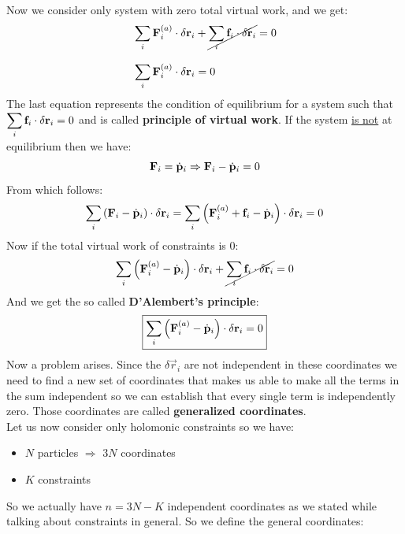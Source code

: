 Now we consider only system with zero total virtual work, and we get:
\begin{equation}
    \begin{split}
      &\displaystyle\sum_i \vb{F}^{(a)}_i \cdot \delta \vb{r}_i + \cancel{\displaystyle\sum_i \vb{f}_i \cdot \delta \vb{r}_i} = 0 \\[8pt]
      &\displaystyle\sum_i \vb{F}^{(a)}_i \cdot \delta \vb{r}_i = 0
    \end{split}
\end{equation}
The last equation represents the condition of equilibrium for a system such that $\displaystyle\sum_i \vb{f}_i \cdot \delta \vb{r}_i = 0$ and is called \textbf{principle of virtual work}.
If the system \underline{is not} at equilibrium then we have:
\begin{equation}
    \vb{F}_i = \dot{\vb{p}}_i \Rightarrow \vb{F}_i - \dot{\vb{p}}_i = 0
\end{equation}
From which follows:
\begin{equation}
    \displaystyle\sum_i \left(\vb{F}_i - \dot{\vb{p}}_i\right) \cdot \delta \vb{r}_i = \displaystyle\sum_i \left(\vb{F}^{(a)}_i + \vb{f}_i - \dot{\vb{p}}_i\right) \cdot \delta \vb{r}_i = 0
\end{equation}
Now if the total virtual work of constraints is 0:
\begin{equation}
    \displaystyle\sum_i \left(\vb{F}^{(a)}_i - \dot{\vb{p}}_i\right) \cdot \delta \vb{r}_i + \cancel{\displaystyle\sum_i \vb{f}_i \cdot \delta \vb{r}_i} = 0
\end{equation}
And we get the so called \textbf{D'Alembert's principle}:
\begin{equation}  \label{D'Alembert_principle}
    \boxed{\displaystyle\sum_i \left(\vb{F}^{(a)}_i - \dot{\vb{p}}_i\right) \cdot \delta \vb{r}_i = 0}
\end{equation}
Now a problem arises. Since the $\delta \vec{r}_i$ are not independent in these coordinates we need to find a new set of coordinates that makes us able to make all the terms in the sum independent so we can establish that every single term is independently zero.
Those coordinates are called \textbf{generalized coordinates}.\\
Let us now consider only holomonic constraints so we have:
\begin{itemize}
    \item $N$ particles $\Rightarrow$ $3N$ coordinates
    \item $K$ constraints
\end{itemize}
So we actually have $n = 3N-K$ independent coordinates as we stated while talking about constraints in general. So we define the general coordinates:
